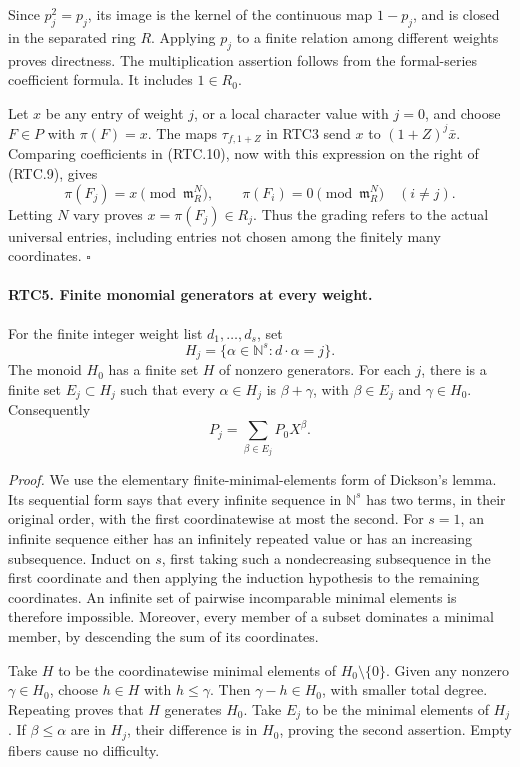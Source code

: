 Since \(p_j^2=p_j\), its image is the kernel of the continuous
map \(1-p_j\), and is closed in the separated ring \(R\).
Applying \(p_j\) to a finite relation among different weights
proves directness.  The multiplication assertion follows from the
formal-series coefficient formula.  It includes \(1\in R_0\).

Let \(x\) be any entry of weight \(j\), or a local character
value with \(j=0\), and choose \(F\in P\) with \(\pi(F)=x\).
The maps \(\tau_{f,1+Z}\) in RTC3 send \(x\) to
\((1+Z)^j\bar x\).  Comparing coefficients in (RTC.10), now
with this expression on the right of (RTC.9), gives
\[
 \pi(F_j)=x\pmod{\mathfrak m_R^N},\qquad
 \pi(F_i)=0\pmod{\mathfrak m_R^N}\quad(i\ne j).
\]
Letting \(N\) vary proves \(x=\pi(F_j)\in R_j\).
Thus the grading refers to the actual universal entries, including
entries not chosen among the finitely many coordinates.
\hfill\(\square\)

\paragraph{RTC5. Finite monomial generators at every weight.}
\label{claim:RTC5}
For the finite integer weight list \(d_1,\ldots,d_s\), set
\[
 H_j=\{\alpha\in\mathbb N^s:d\cdot\alpha=j\}.
\]
The monoid \(H_0\) has a finite set \(H\) of nonzero generators.
For each \(j\), there is a finite set \(E_j\subset H_j\) such
that every \(\alpha\in H_j\) is \(\beta+\gamma\), with
\(\beta\in E_j\) and \(\gamma\in H_0\).  Consequently
\[
 P_j=\sum_{\beta\in E_j}P_0X^\beta.
                                                        \tag{RTC.11}
\]

\emph{Proof.}
We use the elementary finite-minimal-elements form of Dickson's
lemma.  Its sequential form says that every infinite sequence in
\(\mathbb N^s\) has two terms, in their original order, with
the first coordinatewise at most the second.  For \(s=1\), an
infinite sequence either has an infinitely repeated value or has an
increasing subsequence.  Induct on \(s\), first taking such a
nondecreasing subsequence in the first coordinate and then applying
the induction hypothesis to the remaining coordinates.  An infinite
set of pairwise incomparable minimal elements is therefore impossible.
Moreover, every member of a subset dominates a minimal member, by
descending the sum of its coordinates.

Take \(H\) to be the coordinatewise minimal elements of
\(H_0\setminus\{0\}\).  Given any nonzero \(\gamma\in H_0\),
choose \(h\in H\) with \(h\leq\gamma\).  Then
\(\gamma-h\in H_0\), with smaller total degree.  Repeating
proves that \(H\) generates \(H_0\).  Take \(E_j\) to be the
minimal elements of \(H_j\).  If \(\beta\leq\alpha\) are in
\(H_j\), their difference is in \(H_0\), proving the second
assertion.  Empty fibers cause no difficulty.

